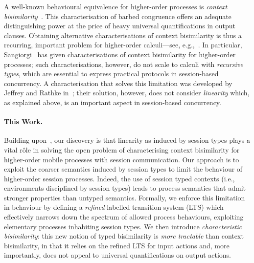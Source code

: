 A well-known behavioural equivalence for higher-order processes
is \emph{context bisimilarity}~\cite{San96H}. This 
 characterisation of %
barbed congruence 
offers an adequate distinguishing power at the price of heavy universal quantifications in output clauses.
Obtaining alternative 
characterisations of context bisimilarity
is thus a recurring, important problem 
for higher-order calculi---see, e.g.,~\cite{SangiorgiD:expmpa,San96H,JeffreyR05,DBLP:journals/cl/KoutavasH12,DBLP:journals/corr/Xu13a,lenglet_et_al:LIPIcs:2015:5364}. 
In particular, Sangiorgi~\cite{SangiorgiD:expmpa,San96H} has 
given %
characterisations of context bisimilarity
for higher-order processes; such 
characterisations, however,  %
do not scale to  
  calculi with \emph{recursive types}, which %
  are essential to %
  express practical protocols in 
session-based concurrency. A characterisation  
that solves this limitation was developed by Jeffrey and Rathke in~\cite{JeffreyR05};
their solution, however, does not consider \emph{linearity} which, as explained above, is an important aspect in session-based concurrency.


\paragraph{This Work.}
Building upon~\cite{SangiorgiD:expmpa,San96H,JeffreyR05}, 
our discovery is that {linearity} as induced by session types plays a vital r\^{o}le 
% 
in 
solving 
the %
open problem 
of characterising context bisimilarity for higher-order mobile processes with session communication.
Our approach is to exploit 
the coarser semantics induced by session types to limit
the behaviour of higher-order session processes. 
Indeed, 
the use of session typed contexts (i.e., environments disciplined by session types) 
leads to process semantics 
that admit stronger properties than untyped semantics.
 Formally, we enforce this limitation in behaviour by defining
a \emph{refined} labelled transition system (LTS)
which effectively 
narrows down the spectrum of allowed process behaviours, 
exploiting elementary processes inhabiting session types.
We then introduce \emph{characteristic bisimilarity}: this  
 new notion of typed bisimilarity   is 
\emph{more tractable} than context bisimilarity, in that 
it relies on the refined LTS for input actions and, more importantly, 
does not appeal to universal quantifications on output actions. 

